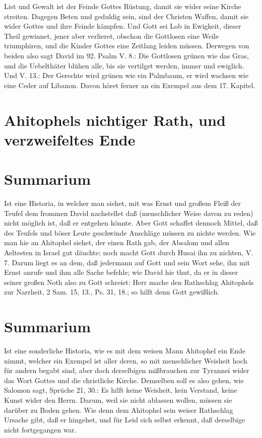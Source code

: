 List und Gewalt ist der Feinde Gottes Rüstung, damit sie wider seine Kirche streiten. Dagegen Beten und geduldig sein, sind der Christen Waffen, damit sie wider Gottes und ihre Feinde kämpfen. Und Gott sei Lob in Ewigkeit, dieser Theil gewinnet, jener aber verlieret, obschon die Gottlosen eine Weile triumphiren, und die Kinder Gottes eine Zeitlang leiden müssen. Derwegen von beiden also sagt David im 92. Psalm V. 8.: Die Gottlosen grünen wie das Gras, und die Uebelthäter blühen alle, bis sie vertilget werden, immer und ewiglich. Und V. 13.: Der Gerechte wird grünen wie ein Palmbaum, er wird wachsen wie eine Ceder auf Libanon. Davon höret ferner an ein Exempel aus dem 17. Kapitel.

\section{Ahitophels nichtiger Rath, und verzweifeltes Ende}

\section{Summarium}

Ist eine Historia, in welcher man siehet, mit was Ernst und großem Fleiß der Teufel dem frommen David nachstellet daß (menschlicher Weise davon zu reden) nicht möglich ist, daß er entgehen könnte. Aber Gott schaffet dennoch Mittel, daß des Teufels und böser Leute geschwinde Anschläge müssen zu nichte werden. Wie man hie an Ahitophel siehet, der einen Rath gab, der Absalom und allen Aeltesten in Israel gut däuchte; noch macht Gott durch Husai ihn zu nichten, V. 7. Darum liegt es an dem, daß jedermann auf Gott und sein Wort sehe, ihn mit Ernst anrufe und ihm alle Sache befehle; wie David hie thut, da er in dieser seiner großen Noth also zu Gott schreiet: Herr mache den Rathschlag Ahitophels zur Narrheit, 2 Sam. 15, 13., Ps. 31, 18.; so hilft denn Gott gewißlich.

\section{Summarium}

Ist eine sonderliche Historia, wie es mit dem weisen Mann Ahitophel ein Ende nimmt, welcher ein Exempel ist aller deren, so mit menschlicher Weisheit hoch für andern begabt sind, aber doch derselbigen mißbrauchen zur Tyrannei wider das Wort Gottes und die christliche Kirche. Demselben soll es also gehen, wie Salomon sagt, Sprüche 21, 30.: Es hilft keine Weisheit, kein Verstand, keine Kunst wider den Herrn. Darum, weil sie nicht ablassen wollen, müssen sie darüber zu Boden gehen. Wie denn dem Ahitophel sein weiser Rathschlag Ursache gibt, daß er hingehet, und für Leid sich selbst erkennt, daß derselbige nicht fortgegangen war.

